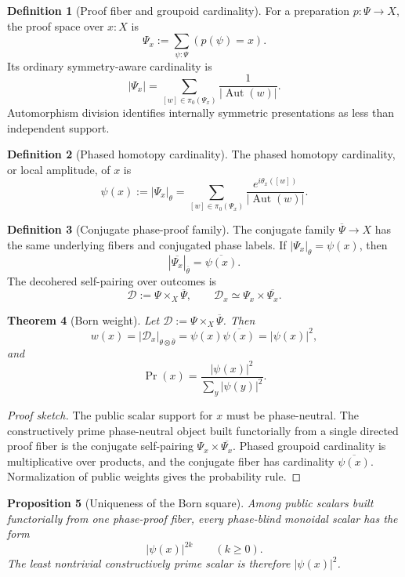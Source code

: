 \documentclass[11pt]{article}
\theoremstyle{plain}
\newtheorem{theorem}{Theorem}[section]
\newtheorem{proposition}[theorem]{Proposition}
\theoremstyle{definition}
\newtheorem{definition}[theorem]{Definition}
\theoremstyle{remark}
\newenvironment{proofsketch}{\begin{proof}[Proof sketch]}{\end{proof}}
\newcommand{\Aut}{\operatorname{Aut}}
\begin{document}
\begin{definition}[Proof fiber and groupoid cardinality]
For a preparation \(p:\Psi\to X\), the proof space over \(x:X\) is
\[
\Psi_x:=\sum_{\psi:\Psi}(p(\psi)=x).
\]
Its ordinary symmetry-aware cardinality is
\[
|\Psi_x|
=
\sum_{[w]\in\pi_0(\Psi_x)}
\frac{1}{|\Aut(w)|}.
\]
Automorphism division identifies internally symmetric presentations as less than independent support.
\end{definition}

\begin{definition}[Phased homotopy cardinality]
The phased homotopy cardinality, or local amplitude, of \(x\) is
\[
\psi(x):=|\Psi_x|_\theta
=
\sum_{[w]\in\pi_0(\Psi_x)}
\frac{e^{i\theta_x([w])}}{|\Aut(w)|}.
\]
\end{definition}

\begin{definition}[Conjugate phase-proof family]
The conjugate family \(\overline{\Psi}\to X\) has the same underlying fibers and conjugated phase labels. If \(|\Psi_x|_\theta=\psi(x)\), then
\[
|\overline{\Psi_x}|_{\overline{\theta}}
=
\overline{\psi(x)}.
\]
The decohered self-pairing over outcomes is
\[
\mathcal{D}:=\Psi\times_X\overline{\Psi},
\qquad
\mathcal{D}_x\simeq\Psi_x\times\overline{\Psi_x}.
\]
\end{definition}

\begin{theorem}[Born weight]
Let \(\mathcal{D}:=\Psi\times_X\overline{\Psi}\). Then
\[
w(x)=|\mathcal{D}_x|_{\theta\otimes\overline{\theta}}
=\psi(x)\overline{\psi(x)}
=|\psi(x)|^2,
\]
and
\[
\Pr(x)=\frac{|\psi(x)|^2}{\sum_y|\psi(y)|^2}.
\]
\end{theorem}

\begin{proofsketch}
The public scalar support for \(x\) must be phase-neutral. The constructively prime phase-neutral object built functorially from a single directed proof fiber is the conjugate self-pairing \(\Psi_x\times\overline{\Psi_x}\). Phased groupoid cardinality is multiplicative over products, and the conjugate fiber has cardinality \(\overline{\psi(x)}\). Normalization of public weights gives the probability rule.
\end{proofsketch}

\begin{proposition}[Uniqueness of the Born square]
Among public scalars built functorially from one phase-proof fiber, every phase-blind monoidal scalar has the form
\[
|\psi(x)|^{2k}\qquad(k\ge0).
\]
The least nontrivial constructively prime scalar is therefore \(|\psi(x)|^2\).
\end{proposition}
\end{document}
